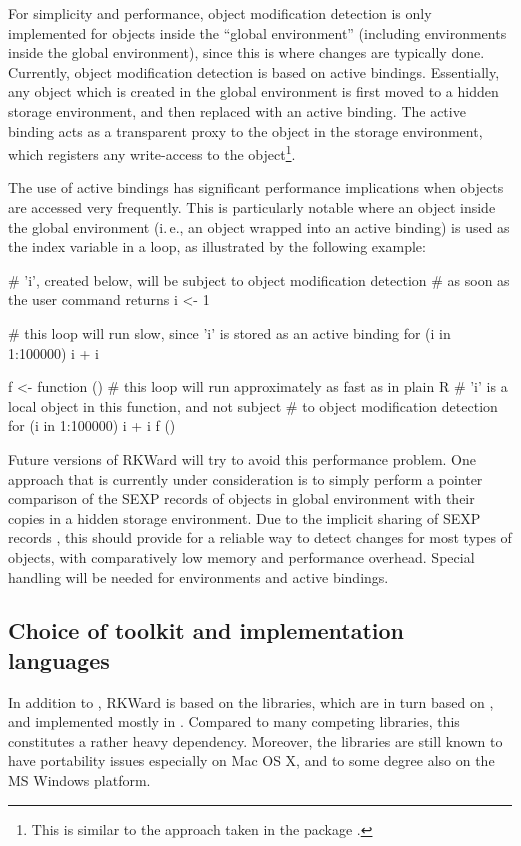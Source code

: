 For simplicity and performance, object modification detection is only
implemented for objects inside the ``global environment'' (including environments
inside the global environment), since this is where changes are typically done.
Currently, object modification detection is based on active bindings.
Essentially, any object which is created in the global environment is first
moved to a hidden storage environment, and then replaced with an active binding.
The active binding acts as a transparent proxy to the object in the storage
environment, which registers any write-access to the object\footnote{
    This is similar to the approach taken in the  package \citep{Plate2009}.
}.

The use of active bindings has significant performance implications when
objects are accessed very frequently. This is particularly notable where an
object inside the global environment (i.\,e., an object wrapped into an active
binding) is used as the index variable in a loop, as illustrated by the
following example:

\begin{Code}
# 'i', created below, will be subject to object modification detection
# as soon as the user command returns
i <- 1

# this loop will run slow, since 'i' is stored as an active binding
for (i in 1:100000) i + i

f <- function () {
    # this loop will run approximately as fast as in plain R
    # 'i' is a local object in this function, and not subject
    # to object modification detection
    for (i in 1:100000) i + i
}
f ()
\end{Code}

Future versions of RKWard will try to avoid this performance problem. 
One approach that is currently under consideration is to simply perform
a pointer comparison of the SEXP records of objects in global environment with
their copies in a hidden storage environment. Due to the implicit sharing of
SEXP records \citep{RDCT2010a, RDCT2010b}, this should provide for a reliable
way to detect changes for most types of  objects, with comparatively low memory
and performance overhead. Special handling will be needed for environments and
active bindings.

\subsection{Choice of toolkit and implementation languages}
\label{sec:technical_toolkit}
In addition to , RKWard is based on the  libraries, which are in turn based
on , and implemented mostly in . Compared to many competing libraries,
this constitutes a rather heavy dependency. Moreover, the  libraries are
still known to have portability issues especially on Mac OS X, and to some degree
also on the MS Windows platform.

